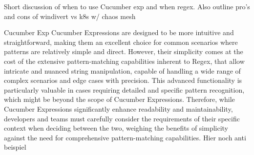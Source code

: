 \label{sec:discussion}

Short discussion of when to use Cucumber exp and when regex. Also outline pro's and cons of windivert vs k8s w/ chaos mesh

Cucumber Exp
Cucumber Expressions are designed to be more intuitive and straightforward, making them an excellent choice for common scenarios where patterns are relatively simple and direct. However, their simplicity comes at the cost of the extensive pattern-matching capabilities inherent to \ac{Regex}, that allow intricate and nuanced string manipulation, capable of handling a wide range of complex scenarios and edge cases with precision. This advanced functionality is particularly valuable in cases requiring detailed and specific pattern recognition, which might be beyond the scope of Cucumber Expressions. Therefore, while Cucumber Expressions significantly enhance readability and maintainability, developers and teams must carefully consider the requirements of their specific context when deciding between the two, weighing the benefits of simplicity against the need for comprehensive pattern-matching capabilities. Hier noch anti beispiel